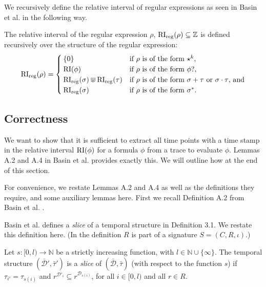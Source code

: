 We recursively define the relative interval of regular expressions as seen in Basin et al. \cite{Basin2020} in the following way.

\begin{definition}
    \label{def:rel-int-reg}
    The relative interval of the regular expression $\rho$, $\operatorname{RI}_{\text{reg}}(\rho) \subseteq \mathbb{Z}$ is defined recursively over the structure of the regular expression:
    \begin{equation*}
        \operatorname{RI}_{\text{reg}}(\rho) =
        \begin{cases}
            \{0\} & \text{if $\rho$ is of the form $\star^k$,} \\
            \operatorname{RI}(\phi) & \text{if $\rho$ is of the form $\phi?$,} \\
            \operatorname{RI}_{\text{reg}}(\sigma) \Cup \operatorname{RI}_{\text{reg}}(\tau) & \text{if $\rho$ is of the form $\sigma + \tau$ or $\sigma \cdot \tau$, and} \\
            \operatorname{RI}_{\text{reg}}(\sigma) & \text{if $\rho$ is of the form $\sigma^*$.}

        \end{cases}
    \end{equation*}
\end{definition}

\subsection{Correctness}
We want to show that it is sufficient to extract all time points with a time stamp in the relative interval $\operatorname{RI}(\phi)$ for a formula $\phi$ from a trace to evaluate $\phi$.
Lemmas A.2 and A.4 in Basin et al. \cite{Basin2016} provides exactly this.
We will outline how at the end of this section.

For convenience, we restate Lemmas A.2 and A.4 as well as the definitions they require, and some auxiliary lemmas here.
First we recall Definition A.2 from Basin et al. \cite{Basin2016}.

Basin et al. \cite{Basin2016} defines a \textit{slice} of a temporal structure in Definition 3.1.
We restate this definition here.
(In the definition $R$ is part of a signature $S=(C,R,\iota)$.)
\begin{definition}
    \label{def:slice}
    Let $s : [0,l) \to \mathbb{N}$ be a strictly increasing function, with $l \in \mathbb{N} \cup \{\infty\}$.
    The temporal structure $(\bar{\mathcal{D}}', \bar{\tau}')$ is a \textit{slice} of $(\bar{\mathcal{D}}, \bar{\tau})$ (with respect to the function $s$) if $\tau_{i'} = \tau_{s(i)}$ and $r^{\mathcal{D}'_i} \subseteq r^{\mathcal{D}_{s(i)}}$, for all $i \in [0,l)$ and all $r \in R$.
\end{definition}

